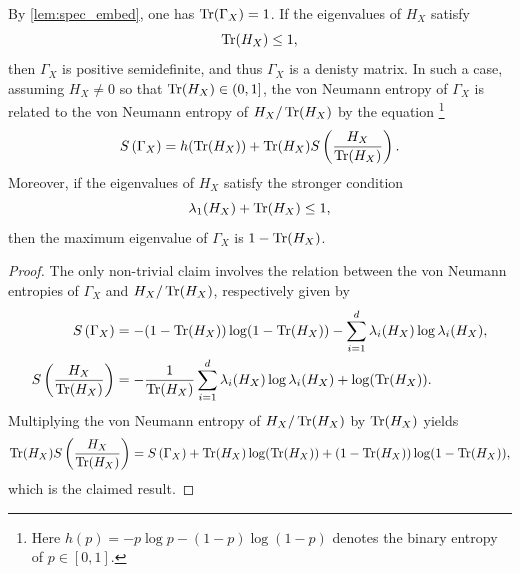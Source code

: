 \documentclass[notitlepage, 10pt]{article}
\begin{document}
\begin{cor}
    By \cref{lem:spec_embed}, one has $\operatorname{Tr}(\Gamma_{X}) = 1$.
    If the eigenvalues of $H_{X}$ satisfy
    \begin{equation}
        \operatorname{Tr}(H_X) \leq 1,
    \end{equation}
    then $\Gamma_{X}$ is positive semidefinite, and thus $\Gamma_{X}$ is a denisty matrix.
    In such a case, assuming $H_X\neq 0$ so that $\operatorname{Tr}(H_X) \in (0,1]$, the von Neumann entropy of $\Gamma_{X}$ is related to the von Neumann entropy of $H_{X} / \operatorname{Tr}(H_X)$ by the equation
    \footnote{%
        Here $h(p) = -p\log p - (1-p)\log(1-p)$ denotes the binary entropy of $p \in [0,1]$.
    }
    \begin{equation}
        S\left(\Gamma_{X}\right) = h(\operatorname{Tr}(H_X)) + \operatorname{Tr}(H_X)S\left(\frac{H_{X}}{\operatorname{Tr}(H_X)}\right).
    \end{equation}
    Moreover, if the eigenvalues of $H_{X}$ satisfy the stronger condition
    \begin{equation}
        \lambda_{1}(H_X) + \operatorname{Tr}(H_X) \leq 1,
    \end{equation}
    then the maximum eigenvalue of $\Gamma_{X}$ is $1-\operatorname{Tr}(H_X)$.
\end{cor}
\begin{proof}
    The only non-trivial claim involves the relation between the von Neumann entropies of $\Gamma_{X}$ and $H_{X} / \operatorname{Tr}(H_X)$, respectively given by
    \begin{align}
        S\left(\Gamma_{X}\right) &= -(1-\operatorname{Tr}(H_X))\log(1-\operatorname{Tr}(H_X)) - \sum_{i=1}^{d} \lambda_i(H_X) \log \lambda_i(H_X), \\
        S\left(\frac{H_{X}}{\operatorname{Tr}(H_X)}\right) &= - \frac{1}{\operatorname{Tr}(H_X)}\sum_{i=1}^{d} \lambda_i(H_X) \log \lambda_i(H_X) + \log(\operatorname{Tr}(H_X)).
    \end{align}
    Multiplying the von Neumann entropy of $H_{X} / \operatorname{Tr}(H_X)$ by $\operatorname{Tr}(H_X)$ yields
    \begin{equation}
        \operatorname{Tr}(H_X)S\left(\frac{H_{X}}{\operatorname{Tr}(H_X)}\right) = S\left(\Gamma_{X}\right) + \operatorname{Tr}(H_X)\log(\operatorname{Tr}(H_X)) + (1-\operatorname{Tr}(H_X))\log(1-\operatorname{Tr}(H_X)),
    \end{equation}
    which is the claimed result.
\end{proof}
\end{document}
